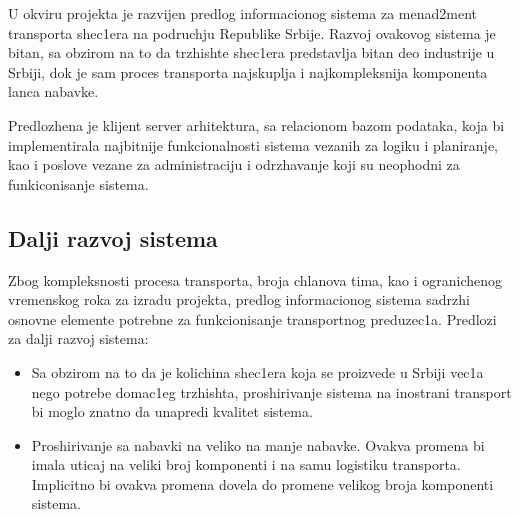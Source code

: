 U okviru projekta je razvijen predlog informacionog sistema za menad2ment transporta shec1era na podruchju Republike Srbije. Razvoj ovakovog sistema je bitan, sa obzirom na to da trzhishte shec1era predstavlja bitan deo industrije u Srbiji, dok je sam proces transporta najskuplja i najkompleksnija komponenta lanca nabavke.

Predlozhena je klijent server arhitektura, sa relacionom bazom podataka, koja bi implementirala najbitnije funkcionalnosti sistema vezanih za logiku i planiranje, kao i poslove vezane za administraciju i odrzhavanje koji su neophodni za funkiconisanje sistema.

\subsection{Dalji razvoj sistema}

Zbog kompleksnosti procesa transporta, broja chlanova tima, kao i ogranichenog vremenskog roka za izradu projekta, predlog informacionog sistema sadrzhi osnovne elemente potrebne za funkcionisanje transportnog preduzec1a. 
Predlozi za dalji razvoj sistema:

\begin{itemize}
    \item Sa obzirom na to da je kolichina shec1era koja se proizvede u Srbiji vec1a nego potrebe domac1eg trzhishta, proshirivanje sistema na inostrani transport bi moglo znatno da unapredi kvalitet sistema.
    \item Proshirivanje sa nabavki na veliko na manje nabavke. Ovakva promena bi imala uticaj na veliki broj komponenti i na samu logistiku transporta. Implicitno bi ovakva promena dovela do promene velikog broja komponenti sistema.

\end{itemize}